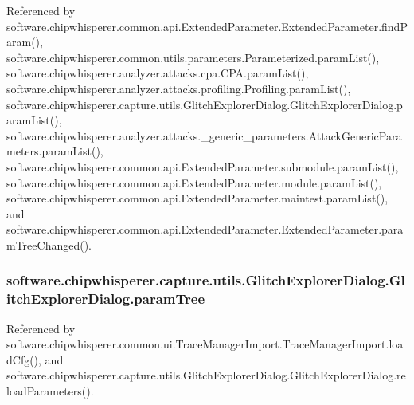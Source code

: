 Referenced by software.\+chipwhisperer.\+common.\+api.\+Extended\+Parameter.\+Extended\+Parameter.\+find\+Param(), software.\+chipwhisperer.\+common.\+utils.\+parameters.\+Parameterized.\+param\+List(), software.\+chipwhisperer.\+analyzer.\+attacks.\+cpa.\+C\+P\+A.\+param\+List(), software.\+chipwhisperer.\+analyzer.\+attacks.\+profiling.\+Profiling.\+param\+List(), software.\+chipwhisperer.\+capture.\+utils.\+Glitch\+Explorer\+Dialog.\+Glitch\+Explorer\+Dialog.\+param\+List(), software.\+chipwhisperer.\+analyzer.\+attacks.\+\_\+generic\+\_\+parameters.\+Attack\+Generic\+Parameters.\+param\+List(), software.\+chipwhisperer.\+common.\+api.\+Extended\+Parameter.\+submodule.\+param\+List(), software.\+chipwhisperer.\+common.\+api.\+Extended\+Parameter.\+module.\+param\+List(), software.\+chipwhisperer.\+common.\+api.\+Extended\+Parameter.\+maintest.\+param\+List(), and software.\+chipwhisperer.\+common.\+api.\+Extended\+Parameter.\+Extended\+Parameter.\+param\+Tree\+Changed().

\hypertarget{classsoftware_1_1chipwhisperer_1_1capture_1_1utils_1_1GlitchExplorerDialog_1_1GlitchExplorerDialog_ab22a80e7727a39ea47245030ae517f6a}{}
\subsubsection[{param\+Tree}]{\setlength{\rightskip}{0pt plus 5cm}software.\+chipwhisperer.\+capture.\+utils.\+Glitch\+Explorer\+Dialog.\+Glitch\+Explorer\+Dialog.\+param\+Tree}\label{classsoftware_1_1chipwhisperer_1_1capture_1_1utils_1_1GlitchExplorerDialog_1_1GlitchExplorerDialog_ab22a80e7727a39ea47245030ae517f6a}


Referenced by software.\+chipwhisperer.\+common.\+ui.\+Trace\+Manager\+Import.\+Trace\+Manager\+Import.\+load\+Cfg(), and software.\+chipwhisperer.\+capture.\+utils.\+Glitch\+Explorer\+Dialog.\+Glitch\+Explorer\+Dialog.\+reload\+Parameters().

\hypertarget{classsoftware_1_1chipwhisperer_1_1capture_1_1utils_1_1GlitchExplorerDialog_1_1GlitchExplorerDialog_a184d326ac72cca41fd798a9a830841a2}{}
